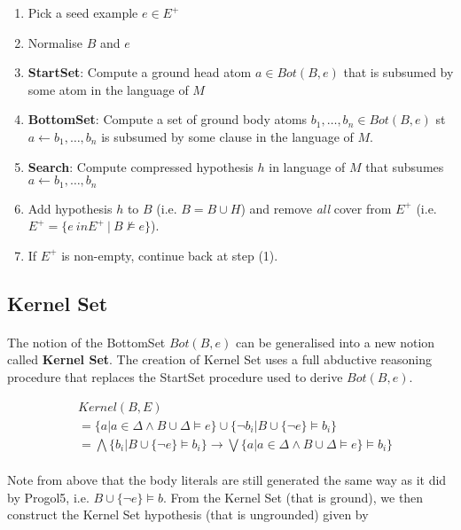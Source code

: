 \documentclass{article}
\theoremstyle{plain}
\theoremstyle{definition}
\begin{document}
\begin{multicols}{2}
\begin{enumerate}
\item Pick a seed example $e \in E^+$
\item Normalise $B$ and $e$
\item \textbf{StartSet}: Compute a ground head atom $a \in Bot(B, e)$ that is subsumed by some atom in the language of $M$
\item \textbf{BottomSet}: Compute a set of ground body atoms $b_1, \dots, b_n \in Bot(B, e)$ st $a \leftarrow b_1,\dots,b_n$ is subsumed by some clause in the language of $M$.
\item \textbf{Search}: Compute compressed hypothesis $h$ in language of $M$ that subsumes $a \leftarrow b_1, \dots, b_n$
\item Add hypothesis $h$ to $B$ (i.e. $B = B \cup H$) and remove \textit{all} cover from $E^+$ (i.e. $E^+ = \{e \ in E^+\ |\ B \not\models e\}$).
\item If $E^+$ is non-empty, continue back at step (1).
\end{enumerate}

\subsection{Kernel Set}

\paragraph{} The notion of the BottomSet $Bot(B, e)$ can be generalised into a new notion called \textbf{Kernel Set}. The creation of Kernel Set uses a full abductive reasoning procedure that replaces the StartSet procedure used to derive $Bot(B, e)$. 

{\footnotesize
\begin{align*}
& Kernel(B, E) \\
&= \{a | a \in \Delta \land B \cup \Delta \models e\} \cup \{\lnot b_i | B \cup \{\lnot e\} \models b_i\} \\
&= \bigwedge \{b_i | B \cup \{\lnot e\} \models b_i\} \rightarrow \bigvee \{a | a \in \Delta \land B \cup \Delta \models e\} \models b_i\}
\end{align*}}

\paragraph{} Note from above that the body literals are still generated the same way as it did by Progol5, i.e. $B \cup \{\lnot e\} \models b$. From the Kernel Set (that is ground), we then construct the Kernel Set hypothesis (that is ungrounded) given by


\end{multicols}
\end{document}
